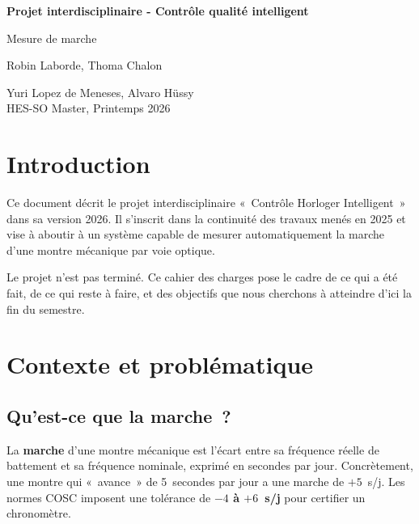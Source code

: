 \documentclass[a4paper,11pt]{article}
\begin{document}
\begin{titlepage}
    \centering
    \vspace*{3cm}
    {\Huge\bfseries Projet interdisciplinaire - Contrôle qualité intelligent\par}
    \vspace{0.8cm}
    {\LARGE Mesure de marche\par}
    \vspace{1.5cm}
    {\Large Robin Laborde, Thoma Chalon\par}
    \vspace{2cm}
    {\large Yuri Lopez de Meneses, Alvaro Hüssy\\
    HES-SO Master, Printemps 2026\par}
    \vfill
\end{titlepage}

\tableofcontents
\newpage

\section{Introduction}

Ce document décrit le projet interdisciplinaire «~Contrôle Horloger Intelligent~» dans sa version 2026. Il s'inscrit dans la continuité des travaux menés en 2025 et vise à aboutir à un système capable de mesurer automatiquement la marche d'une montre mécanique par voie optique.

Le projet n'est pas terminé. Ce cahier des charges pose le cadre de ce qui a été fait, de ce qui reste à faire, et des objectifs que nous cherchons à atteindre d'ici la fin du semestre.

\section{Contexte et problématique}

\subsection{Qu'est-ce que la marche~?}

La \textbf{marche} d'une montre mécanique est l'écart entre sa fréquence réelle de battement et sa fréquence nominale, exprimé en secondes par jour. Concrètement, une montre qui «~avance~» de 5~secondes par jour a une marche de $+5$~s/j. Les normes COSC imposent une tolérance de \textbf{$-4$ à $+6$~s/j} pour certifier un chronomètre.
\end{document}
